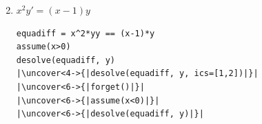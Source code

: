 \begin{frame}[fragile]

\begin{enumerate}
\setcounter{enumi}{1}
  \item $x^2y' = (x-1)y$

\pause

\begin{algo}
\begin{lstlisting}
equadiff = x^2*yy == (x-1)*y
assume(x>0)
desolve(equadiff, y)
|\uncover<4->{|desolve(equadiff, y, ics=[1,2])|}|
|\uncover<6->{|forget()|}|
|\uncover<6->{|assume(x<0)|}|
|\uncover<6->{|desolve(equadiff, y)|}|
\end{lstlisting}
\end{algo}

\vspace*{-.5ex}

  \begin{enumerate}
    
    \medskip
    
    
    \medskip
        

  \end{enumerate}
  
\end{enumerate}  
\end{frame}



